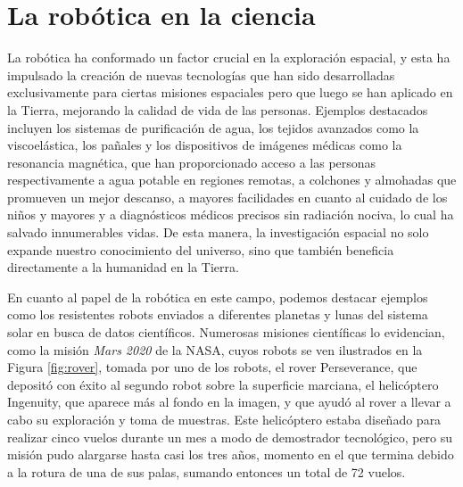 \section{La robótica en la ciencia}
\label{sec:exploracion_espacial} %

La robótica ha conformado un factor crucial en la exploración espacial, y esta
ha impulsado la creación de nuevas tecnologías que han sido desarrolladas
exclusivamente para ciertas misiones espaciales pero que luego se han aplicado
en la Tierra, mejorando la calidad de vida de las personas.
Ejemplos destacados incluyen los sistemas de purificación de agua, los tejidos
avanzados como la viscoelástica, los pañales y los dispositivos de imágenes
médicas como la resonancia magnética, que han proporcionado acceso a las
personas respectivamente a agua potable en regiones remotas, a colchones y
almohadas que promueven un mejor descanso, a mayores facilidades en cuanto al
cuidado de los niños y mayores y a diagnósticos médicos precisos sin radiación
nociva, lo cual ha salvado innumerables vidas.
De esta manera, la investigación espacial no solo expande nuestro conocimiento
del universo, sino que también beneficia directamente a la humanidad en la
Tierra.

En cuanto al papel de la robótica en este campo, podemos destacar ejemplos como
los resistentes robots enviados a diferentes planetas y lunas del sistema solar
en busca de datos científicos.
Numerosas misiones científicas lo evidencian, como la misión \textit{Mars 2020}
de la NASA, cuyos robots se ven ilustrados en la Figura \ref{fig:rover}, tomada
por uno de los robots, el rover Perseverance, que depositó con éxito al segundo
robot sobre la superficie marciana, el helicóptero Ingenuity, que aparece más al
fondo en la imagen, y que ayudó al rover a llevar a cabo su exploración y toma
de muestras.
Este helicóptero estaba diseñado para realizar cinco vuelos durante un mes a
modo de demostrador tecnológico, pero su misión pudo alargarse hasta casi los
tres años, momento en el que termina debido a la rotura de una de sus palas,
sumando entonces un total de 72 vuelos.

